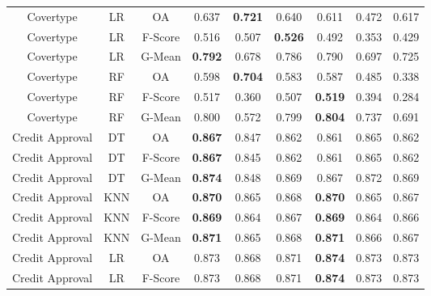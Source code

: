 \begin{longtable}{ccccccccc}
         Covertype &         LR &      OA &          0.637 & \textbf{0.721} &          0.640 &          0.611 &          0.472 &          0.617 \\
         Covertype &         LR & F-Score &          0.516 &          0.507 & \textbf{0.526} &          0.492 &          0.353 &          0.429 \\
         Covertype &         LR &  G-Mean & \textbf{0.792} &          0.678 &          0.786 &          0.790 &          0.697 &          0.725 \\
         Covertype &         RF &      OA &          0.598 & \textbf{0.704} &          0.583 &          0.587 &          0.485 &          0.338 \\
         Covertype &         RF & F-Score &          0.517 &          0.360 &          0.507 & \textbf{0.519} &          0.394 &          0.284 \\
         Covertype &         RF &  G-Mean &          0.800 &          0.572 &          0.799 & \textbf{0.804} &          0.737 &          0.691 \\
   Credit Approval &         DT &      OA & \textbf{0.867} &          0.847 &          0.862 &          0.861 &          0.865 &          0.862 \\
   Credit Approval &         DT & F-Score & \textbf{0.867} &          0.845 &          0.862 &          0.861 &          0.865 &          0.862 \\
   Credit Approval &         DT &  G-Mean & \textbf{0.874} &          0.848 &          0.869 &          0.867 &          0.872 &          0.869 \\
   Credit Approval &        KNN &      OA & \textbf{0.870} &          0.865 &          0.868 & \textbf{0.870} &          0.865 &          0.867 \\
   Credit Approval &        KNN & F-Score & \textbf{0.869} &          0.864 &          0.867 & \textbf{0.869} &          0.864 &          0.866 \\
   Credit Approval &        KNN &  G-Mean & \textbf{0.871} &          0.865 &          0.868 & \textbf{0.871} &          0.866 &          0.867 \\
   Credit Approval &         LR &      OA &          0.873 &          0.868 &          0.871 & \textbf{0.874} &          0.873 &          0.873 \\
   Credit Approval &         LR & F-Score &          0.873 &          0.868 &          0.871 & \textbf{0.874} &          0.873 &          0.873 \\

\end{longtable}
